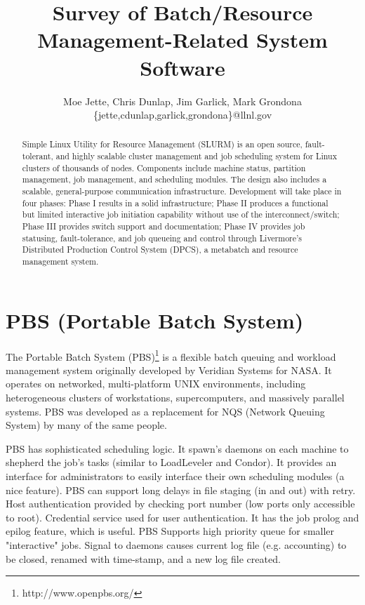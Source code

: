 \documentclass{article}
\author{Moe Jette, Chris Dunlap, Jim Garlick, Mark Grondona\\
        \{jette,cdunlap,garlick,grondona\}@llnl.gov}
\title{Survey of Batch/Resource Management-Related System Software}
\begin{document}
\maketitle

\begin{abstract}
Simple Linux Utility for Resource Management (SLURM) is an open source,
fault-tolerant, and highly scalable cluster management and job 
scheduling system for Linux clusters of 
thousands of nodes.  Components include machine status, partition
management, job management, and scheduling modules.  The design also 
includes a scalable, general-purpose communication infrastructure.
Development will take place in four phases:  Phase I results in a solid
infrastructure;  Phase II produces a functional but limited interactive 
job initiation capability without use of the interconnect/switch; 
Phase III provides switch support and documentation; Phase IV provides 
job statusing, fault-tolerance, and job queueing and control through  
Livermore's Distributed Production Control System (DPCS), a metabatch and
resource management system.
\end{abstract}

\vspace{0.25in}

\section{PBS (Portable Batch System)}

The Portable Batch System (PBS)\footnote{http://www.openpbs.org/}
is a flexible batch queuing and 
workload management system originally developed by Veridian Systems 
for NASA.  It operates on networked, multi-platform UNIX environments, 
including heterogeneous clusters of workstations, supercomputers, and 
massively parallel systems. PBS was developed as a replacement for 
NQS (Network Queuing System) by many of the same people.

PBS has sophisticated scheduling logic. It spawn's daemons on each 
machine to shepherd the job's tasks (similar to LoadLeveler 
and Condor). It provides an interface for administrators to easily 
interface their own scheduling modules (a nice feature).  PBS can support 
long delays in file staging (in and out) with retry.  Host 
authentication provided by checking port number (low ports only 
accessible to root).  Credential service used for user authentication. 
It has the job prolog and epilog feature, which is useful.  PBS Supports 
high priority queue for smaller "interactive" jobs.  Signal to daemons 
causes current log file (e.g. accounting) to be closed, renamed with 
time-stamp, and a new log file created.
\end{document}
